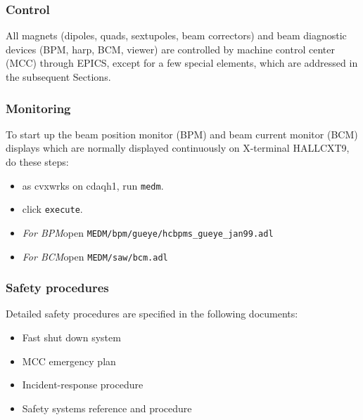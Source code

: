 \subsubsection{Control}

All magnets (dipoles, quads, sextupoles, beam
correctors) and beam diagnostic devices (BPM, harp, BCM, viewer)
are controlled by machine control center (MCC) through EPICS,
except for a few special elements, which are addressed in the
subsequent Sections.

\subsubsection{Monitoring}
To start up the beam position monitor (BPM) and beam current monitor
(BCM) displays which are normally displayed continuously on X-terminal
HALLCXT9, do these steps:
\begin{itemize}
  \item {as cvxwrks on cdaqh1, run \verb|medm|.}
  \item {click \verb|execute|.}
  \item {{\em For BPM}open \verb|MEDM/bpm/gueye/hcbpms_gueye_jan99.adl|}
  \item {{\em For BCM}open \verb|MEDM/saw/bcm.adl|}
\end{itemize}
  

\subsubsection{Safety procedures}

Detailed safety procedures are specified in the following documents:

\begin{itemize}
\item{Fast shut down system}
\item{MCC emergency plan}
\item{Incident-response procedure}
\item{Safety systems reference and procedure}
\end{itemize}

